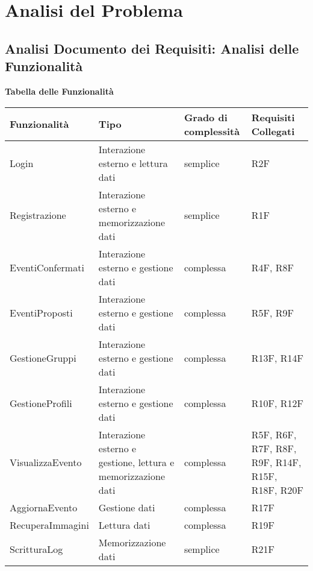 \newpage
\section{Analisi del Problema}
\subsection{Analisi Documento dei Requisiti: Analisi delle Funzionalità}
\hfill \break

\textbf{Tabella delle Funzionalità}
\hfill \break

\begin{tabular} {|P{4cm}|P{4cm}|P{3.5cm}|P{4cm}|} %
    \hline
    \textbf{Funzionalità} & \textbf{Tipo}                                                 & \textbf{Grado di complessità} & \textbf{Requisiti Collegati}                    \\
    \hline
    Login                 & Interazione esterno e lettura dati                            & semplice                      & R2F                                             \\
    \hline
    Registrazione         & Interazione esterno e memorizzazione dati                     & semplice                      & R1F                                             \\
    \hline
    EventiConfermati      & Interazione esterno e gestione dati                           & complessa                     & R4F, R8F                                        \\
    \hline
    EventiProposti        & Interazione esterno e gestione dati                           & complessa                     & R5F, R9F                                        \\
    \hline
    GestioneGruppi        & Interazione esterno e gestione dati                           & complessa                     & R13F, R14F                                      \\
    \hline
    GestioneProfili       & Interazione esterno e gestione dati                           & complessa                     & R10F, R12F                                      \\
    \hline
    VisualizzaEvento      & Interazione esterno e gestione, lettura e memorizzazione dati & complessa                     & R5F, R6F, R7F, R8F, R9F, R14F, R15F, R18F, R20F \\
    \hline
    AggiornaEvento        & Gestione dati                                                 & complessa                     & R17F                                            \\
    \hline
    RecuperaImmagini      & Lettura dati                                                  & complessa                     & R19F                                            \\
    \hline
    ScritturaLog          & Memorizzazione dati                                           & semplice                      & R21F                                            \\
    \hline
\end{tabular}

